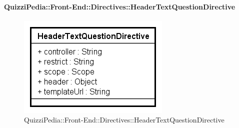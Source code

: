 		\paragraph{QuizziPedia::Front-End::Directives::HeaderTextQuestionDirective}
		
		\label{QuizziPedia::Front-End::Directives::HeaderTextQuestionDirective}
		
		\begin{figure}[ht]
			\centering
			\includegraphics[scale=0.80,keepaspectratio]{UML/Classi/Front-End/QuizziPedia_Front-end_Templates_HeaderTextQuestionTemplate.png}
			\caption{QuizziPedia::Front-End::Directives::HeaderTextQuestionDirective}
		\end{figure} \FloatBarrier
		
